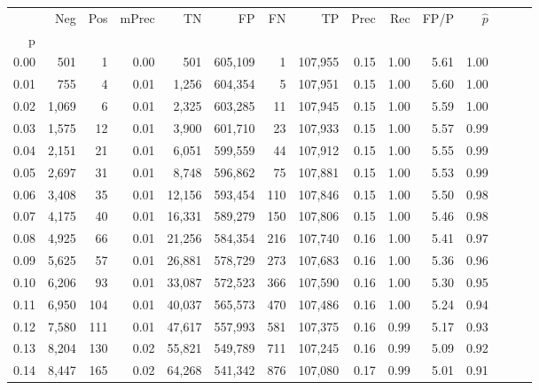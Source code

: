 \begin{tabular}{rrrrrrrrrrrrrrr}
\toprule
{} &     Neg &    Pos & mPrec &       TN &       FP &       FN &       TP &  Prec &   Rec &  FP/P & $\hat{p}$ \\
p    &         &        &       &          &          &          &          &       &       &       &           \\
\midrule
0.00 &     501 &      1 &  0.00 &      501 &  605,109 &        1 &  107,955 &  0.15 &  1.00 &  5.61 &      1.00 \\
0.01 &     755 &      4 &  0.01 &    1,256 &  604,354 &        5 &  107,951 &  0.15 &  1.00 &  5.60 &      1.00 \\
0.02 &   1,069 &      6 &  0.01 &    2,325 &  603,285 &       11 &  107,945 &  0.15 &  1.00 &  5.59 &      1.00 \\
0.03 &   1,575 &     12 &  0.01 &    3,900 &  601,710 &       23 &  107,933 &  0.15 &  1.00 &  5.57 &      0.99 \\
0.04 &   2,151 &     21 &  0.01 &    6,051 &  599,559 &       44 &  107,912 &  0.15 &  1.00 &  5.55 &      0.99 \\
0.05 &   2,697 &     31 &  0.01 &    8,748 &  596,862 &       75 &  107,881 &  0.15 &  1.00 &  5.53 &      0.99 \\
0.06 &   3,408 &     35 &  0.01 &   12,156 &  593,454 &      110 &  107,846 &  0.15 &  1.00 &  5.50 &      0.98 \\
0.07 &   4,175 &     40 &  0.01 &   16,331 &  589,279 &      150 &  107,806 &  0.15 &  1.00 &  5.46 &      0.98 \\
0.08 &   4,925 &     66 &  0.01 &   21,256 &  584,354 &      216 &  107,740 &  0.16 &  1.00 &  5.41 &      0.97 \\
0.09 &   5,625 &     57 &  0.01 &   26,881 &  578,729 &      273 &  107,683 &  0.16 &  1.00 &  5.36 &      0.96 \\
0.10 &   6,206 &     93 &  0.01 &   33,087 &  572,523 &      366 &  107,590 &  0.16 &  1.00 &  5.30 &      0.95 \\
0.11 &   6,950 &    104 &  0.01 &   40,037 &  565,573 &      470 &  107,486 &  0.16 &  1.00 &  5.24 &      0.94 \\
0.12 &   7,580 &    111 &  0.01 &   47,617 &  557,993 &      581 &  107,375 &  0.16 &  0.99 &  5.17 &      0.93 \\
0.13 &   8,204 &    130 &  0.02 &   55,821 &  549,789 &      711 &  107,245 &  0.16 &  0.99 &  5.09 &      0.92 \\
0.14 &   8,447 &    165 &  0.02 &   64,268 &  541,342 &      876 &  107,080 &  0.17 &  0.99 &  5.01 &      0.91 \\

\end{tabular}
